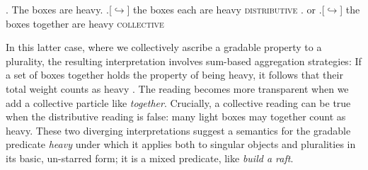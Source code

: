 \documentclass[linguex]{sp}
\begin{document}
\ex. The boxes are heavy.
\a.[$\hookrightarrow$] the boxes each are heavy \hfill \textsc{distributive}
\z. or
\a.[$\hookrightarrow$] the boxes together are heavy \hfill \textsc{collective}

In this latter case, where we collectively ascribe a gradable property to a plurality, the resulting interpretation involves sum-based aggregation strategies: If a set of boxes together holds the property of being heavy, it follows that their total weight counts as heavy \citep{scha1984}. The reading becomes more transparent when we add a collective particle like \emph{together}. Crucially, a collective reading can be true when the distributive reading is false: many light boxes may together count as heavy. These two diverging interpretations suggest a semantics for the gradable predicate \emph{heavy} under which it applies both to singular objects and pluralities in its basic, un-starred form; it is a mixed predicate, like \emph{build a raft}. 
\end{document}
